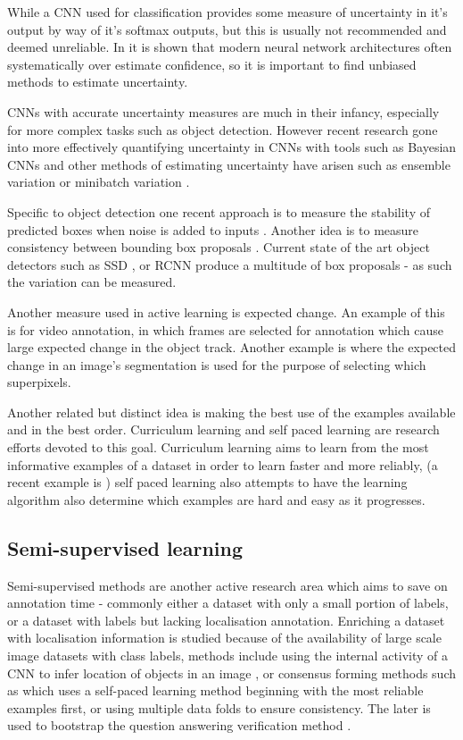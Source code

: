 While a \gls{CNN} used for classification provides some measure of uncertainty in it's output by way of it's softmax outputs, but this is usually not recommended and deemed unreliable. In \cite{Guo2017} it is shown that modern neural network architectures often systematically over estimate confidence, so it is important to find unbiased methods to estimate uncertainty.

\gls{CNN}s with accurate uncertainty measures are much in their infancy, especially for more complex tasks such as object detection. However recent research gone into more effectively quantifying uncertainty in \gls{CNN}s with tools such as Bayesian \gls{CNN}s \cite{Gal2017} and other methods of estimating uncertainty have arisen such as ensemble variation \cite{Beluch2018} or minibatch variation \cite{Chang2017}. 

Specific to object detection one recent approach is to measure the stability of predicted boxes when noise is added to inputs \cite{Kao2018}. Another idea is to measure consistency between bounding box proposals \cite{Kao2018, Brust2018, Le2018}. Current state of the art object detectors such as \gls{SSD} \cite{Liu2016a}, or \gls{RCNN} \cite{Wang2017} produce a multitude of box proposals - as such the variation can be measured.

Another measure used in active learning is expected change. An example of this is \cite{Vondrick2011} for video annotation, in which frames are selected for annotation which cause large expected change in the object track. Another example is \cite{Xu2017} where the expected change in an image's segmentation is used for the purpose of selecting which superpixels. 

Another related but distinct idea is making the best use of the examples available and in the best order. Curriculum learning and self paced learning \cite{Kumar2010} are research efforts devoted to this goal. Curriculum learning aims to learn from the most informative examples of a dataset in order to learn faster and more reliably, (a recent example is \cite{Katharopoulos2018}) self paced learning also attempts to have the learning algorithm also determine which examples are hard and easy as it progresses.


\subsection{Semi-supervised learning}

Semi-supervised methods are another active research area which aims to save on annotation time - commonly either a dataset with only a small portion of labels, or a dataset with labels but lacking localisation annotation. Enriching a dataset with localisation information is studied because of the availability of large scale image datasets with class labels, methods include using the internal activity of a \gls{CNN} to infer location of objects in an image \cite{Sivic2015}, or consensus forming methods such as \cite{Sangineto} which uses a self-paced learning method beginning with the most reliable examples first, or \cite{Cinbis2017} using multiple data folds to ensure consistency. The later is used to bootstrap the question answering verification method \cite{Papadopoulos2016}.

